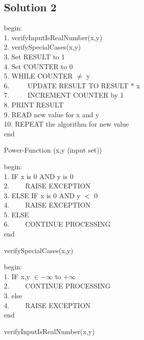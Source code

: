 \documentclass[a4paper,12pt]{article}
\begin{document}
\setcounter{algocf}{0}

\subsection{Solution 2}
\begin{algorithm}[H]
	begin: \\
	1. verifyInputIsRealNumber(x,y)\\
	2. verifySpecialCases(x,y) \\
	3. Set RESULT to 1 \\
	4. Set COUNTER to 0\\
	5. WHILE COUNTER $\neq$ y \\
	6. $\hspace{2em}$ UPDATE RESULT TO RESULT * x\\
	7. $\hspace{2em}$ INCREMENT COUNTER by 1\\
	8. PRINT RESULT \\
	9. READ new value for x and y\\
	10. REPEAT the algorithm for new value \\
	end
	\caption{Power-Function (x,y (input set))}
\end{algorithm}

\vspace{0.5cm}

\begin{algorithm}
	begin:\\
	1. IF x is 0 AND y is 0 \\
	2. $\hspace{2em}$RAISE EXCEPTION \\
	3. ELSE IF x is 0 AND y $<$ 0 \\
	4. $\hspace{2em}$RAISE EXCEPTION \\
	5. ELSE \\
	6. $\hspace{2em}$CONTINUE PROCESSING \\
	end
	\caption{verifySpecialCases(x,y)}
\end{algorithm}

\begin{algorithm}
	begin:\\
	1. IF  x,y $\in -\infty$  to  +$\infty$ \\
	2. $\hspace{2em}$CONTINUE PROCESSING\\
	3. else\\
	4. $\hspace{2em}$RAISE EXCEPTION \\
	end
	\caption{verifyInputIsRealNumber(x,y)}
\end{algorithm}
\end{document}

